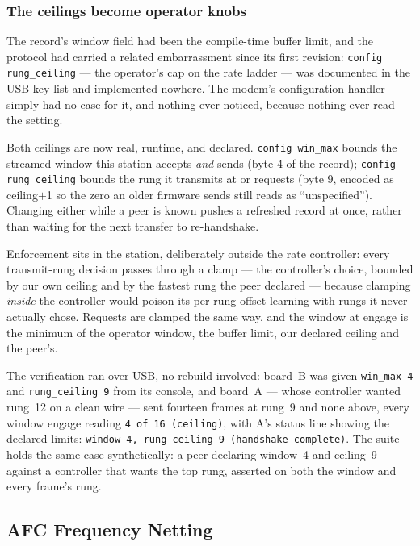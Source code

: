 \subsubsection{The ceilings become operator knobs}

The record's window field had been the compile-time buffer limit, and
the protocol had carried a related embarrassment since its first
revision: \texttt{config rung\_ceiling} --- the operator's cap on the
rate ladder --- was documented in the USB key list and implemented
nowhere. The modem's configuration handler simply had no case for it,
and nothing ever noticed, because nothing ever read the setting.

Both ceilings are now real, runtime, and declared. \texttt{config
win\_max} bounds the streamed window this station accepts \emph{and}
sends (byte 4 of the record); \texttt{config rung\_ceiling} bounds
the rung it transmits at or requests (byte 9, encoded as
ceiling$+$1 so the zero an older firmware sends still reads as
``unspecified''). Changing either while a peer is known pushes a
refreshed record at once, rather than waiting for the next transfer to
re-handshake.

Enforcement sits in the station, deliberately outside the rate
controller: every transmit-rung decision passes through a clamp ---
the controller's choice, bounded by our own ceiling and by the fastest
rung the peer declared --- because clamping \emph{inside} the
controller would poison its per-rung offset learning with rungs it
never actually chose. Requests are clamped the same way, and the
window at engage is the minimum of the operator window, the buffer
limit, our declared ceiling and the peer's.

The verification ran over USB, no rebuild involved: board~B was given
\texttt{win\_max 4} and \texttt{rung\_ceiling 9} from its console,
and board~A --- whose controller wanted rung~12 on a clean wire ---
sent fourteen frames at rung~9 and none above, every window engage
reading \texttt{4 of 16 (ceiling)}, with A's status line showing the
declared limits: \texttt{window 4, rung ceiling 9 (handshake
complete)}. The suite holds the same case synthetically: a peer
declaring window~4 and ceiling~9 against a controller that wants the
top rung, asserted on both the window and every frame's rung.

\subsection{AFC Frequency Netting}
\label{sec:afc}

